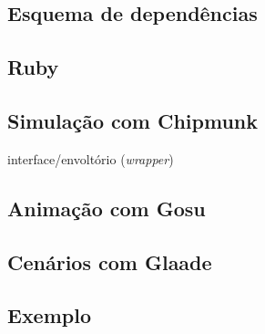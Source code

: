 \subsection{Esquema de dependências }
\subsection{Ruby}

\subsection{Simulação com Chipmunk}

interface/envoltório (\textit{wrapper})

\subsection{Animação com Gosu}
\subsection{Cenários com Glaade}
\subsection{Exemplo}
